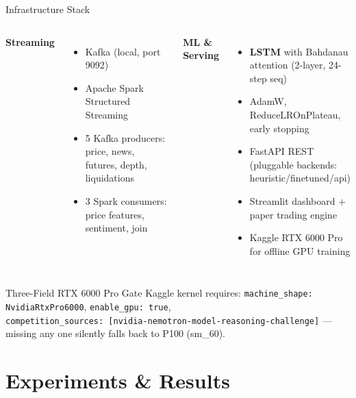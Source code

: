 \documentclass[10pt,aspectratio=169]{beamer}
\begin{document}
\begin{frame}{Infrastructure Stack}
  \begin{columns}[t]
    \textbf{Streaming}
    \begin{itemize}
      \item Kafka (local, port 9092)
      \item Apache Spark Structured Streaming
      \item 5 Kafka producers: price, news, futures, depth, liquidations
      \item 3 Spark consumers: price features, sentiment, join
    \end{itemize}
    
    \textbf{ML \& Serving}
    \begin{itemize}
      \item \textbf{LSTM} with Bahdanau attention (2-layer, 24-step seq)
      \item AdamW, ReduceLROnPlateau, early stopping
      \item FastAPI REST (pluggable backends: heuristic/finetuned/api)
      \item Streamlit dashboard + paper trading engine
      \item Kaggle RTX 6000 Pro for offline GPU training
    \end{itemize}
  \end{columns}
  \vspace{0.3cm}
  \begin{exampleblock}{Three-Field RTX 6000 Pro Gate}
    Kaggle kernel requires: \texttt{machine\_shape: NvidiaRtxPro6000}, \texttt{enable\_gpu: true}, \\
    \texttt{competition\_sources: [nvidia-nemotron-model-reasoning-challenge]} — missing any one silently falls back to P100 (sm\_60).
  \end{exampleblock}
\end{frame}

\section{Experiments \& Results}
\end{document}
